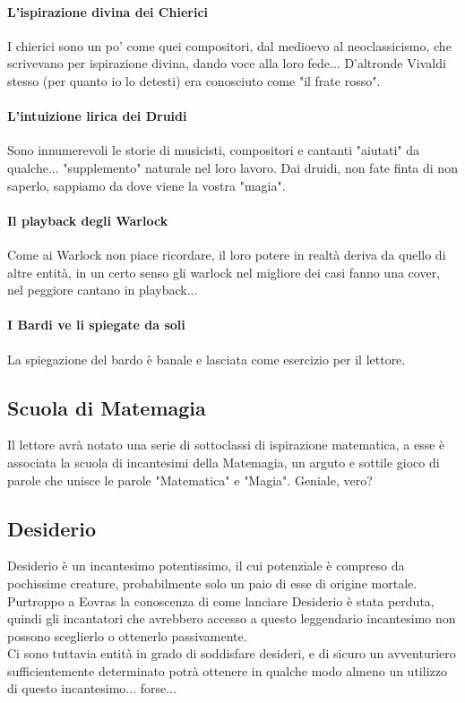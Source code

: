 \paragraph{L'ispirazione divina dei Chierici}I chierici sono un po' come quei compositori, dal medioevo al neoclassicismo, che scrivevano per ispirazione divina, dando voce alla loro fede... D'altronde Vivaldi stesso (per quanto io lo detesti) era conosciuto come "il frate rosso".
\paragraph{L'intuizione lirica dei Druidi}Sono innumerevoli le storie di musicisti, compositori e cantanti "aiutati" da qualche... "supplemento" naturale nel loro lavoro. Dai druidi, non fate finta di non saperlo, sappiamo da dove viene la vostra "magia".
\paragraph{Il playback degli Warlock}Come ai Warlock non piace ricordare, il loro potere in realtà deriva da quello di altre entità, in un certo senso gli warlock nel migliore dei casi fanno una cover, nel peggiore cantano in playback...
\paragraph{I Bardi ve li spiegate da soli}La spiegazione del bardo è banale e lasciata come esercizio per il lettore.

\subsection{Scuola di Matemagia}

Il lettore avrà notato una serie di sottoclassi di ispirazione matematica, a esse è associata la scuola di incantesimi della Matemagia, un arguto e sottile gioco di parole che unisce le parole "Matematica" e "Magia". Geniale, vero?

\subsection{Desiderio}

Desiderio è un incantesimo potentissimo, il cui potenziale è compreso da pochissime creature, probabilmente solo un paio di esse di origine mortale. \\ Purtroppo a Eovras la conoscenza di come lanciare Desiderio è stata perduta, quindi gli incantatori che avrebbero accesso a questo leggendario incantesimo non possono sceglierlo o ottenerlo passivamente. \\ Ci sono tuttavia entità in grado di soddisfare desideri, e di sicuro un avventuriero sufficientemente determinato potrà ottenere in qualche modo almeno un utilizzo di questo incantesimo... forse...

